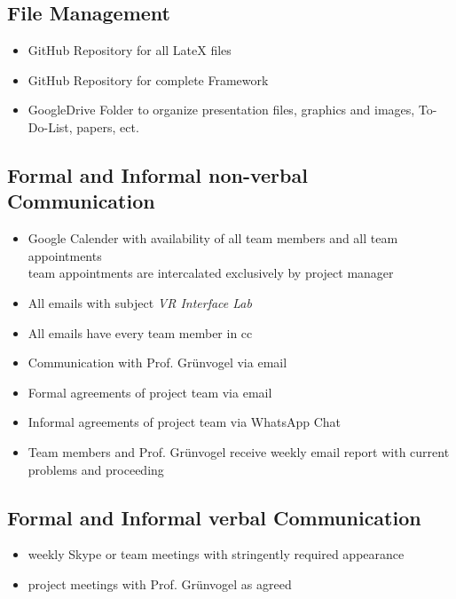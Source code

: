 \documentclass[a4paper, 12pt]{article}
\begin{document}
\subsection{File Management}
\begin{itemize}
\item GitHub Repository for all LateX files
\item GitHub Repository for complete Framework
\item GoogleDrive Folder to organize presentation files, graphics and images, To-Do-List, papers, ect. 
\end{itemize}

\subsection{Formal and Informal non-verbal Communication}
\begin{itemize}
\item Google Calender with availability of all team members and all team appointments\\
team appointments are  intercalated exclusively by project manager
\item All emails with subject \textit{VR Interface Lab} 
\item All emails have every team member in cc
\item Communication with Prof. Grünvogel via email
\item Formal agreements of project team via email
\item Informal agreements of project team via WhatsApp Chat
\item Team members and Prof. Grünvogel receive weekly email report with current problems and proceeding 
\end{itemize}
\subsection{Formal and Informal verbal Communication}
\begin{itemize}
	\item weekly Skype or team meetings with stringently required appearance
	\item project meetings with Prof. Grünvogel as agreed 
\end{itemize}
\end{document}
